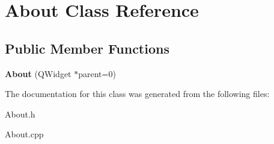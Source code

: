 \hypertarget{class_about}{\section{\-About \-Class \-Reference}
\label{class_about}
}
\subsection*{\-Public \-Member \-Functions}
\begin{DoxyCompactItemize}
\item 
\hypertarget{class_about_ab79599ebbcdeffe0a96e00f010e64177}{{\bfseries \-About} (\-Q\-Widget $\ast$parent=0)}\label{class_about_ab79599ebbcdeffe0a96e00f010e64177}

\end{DoxyCompactItemize}


\-The documentation for this class was generated from the following files\-:\begin{DoxyCompactItemize}
\item 
\-About.\-h\item 
\-About.\-cpp\end{DoxyCompactItemize}
